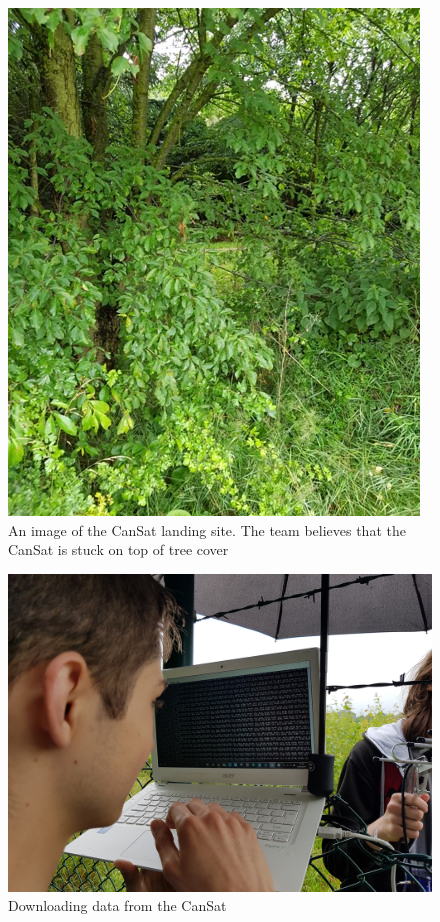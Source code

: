 \documentclass[]{report}
\begin{document}
	\begin{figure}[h]
		\hfill\includegraphics[scale=1.2]{cloc.jpg}\hspace*{\fill}
		\caption{An image of the CanSat landing site. The team believes that the CanSat is stuck on top of tree cover}
		\label{cloc}
	\end{figure}

	\begin{figure}[h]
	\hfill\includegraphics[scale=0.13]{retrieval.jpg}\hspace*{\fill}
	\caption{Downloading data from the CanSat}
	\label{dl}
	\end{figure}
	
\end{document}
